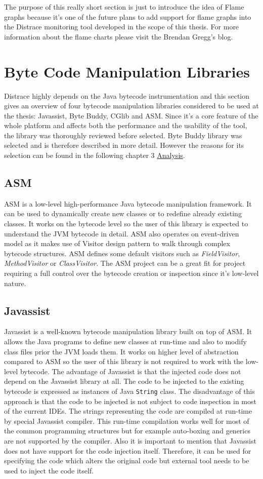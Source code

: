 The purpose of this really short section is just to introduce the idea of Flame graphs because it's one of the future plans to add support for flame graphs into the Distrace monitoring tool developed in the scope of this thesis. For more information about the flame charts please visit the Brendan Gregg's blog.
\section{Byte Code Manipulation Libraries}
Distrace highly depends on the Java bytecode instrumentation and this section gives an overview of four bytecode manipulation libraries considered to be used at the thesis: Javassist, Byte Buddy, CGlib and ASM. Since it's a core feature of the whole platform and affects both the performance and the usability of the tool, the library was thoroughly reviewed before selected. Byte Buddy library was selected and is therefore described in more detail. However the reasons for its selection can be found in the following chapter 3 \hyperref[analysis]{Analysis}.

\subsection{ASM}
\label{asm}
ASM is a low-level high-performance Java bytecode manipulation framework. It can be used to dynamically create new classes or to redefine already existing classes. It works on the bytecode level so the user of this library is expected to understand the JVM bytecode in detail. ASM also operates on event-driven model as it makes use of Visitor design pattern to walk through complex bytecode structures. ASM defines some default visitors such as \textit{FieldVisitor}, \textit{MethodVisitor} or \textit{ClassVisitor}. The ASM project can be a great fit for project requiring a full control over the bytecode creation or inspection since it's low-level nature.
\subsection{Javassist}
\label{javassist}
Javassist is a well-known bytecode manipulation library built on top of ASM. It allows the Java programs to define new classes at run-time and also to modify class files prior the JVM loads them. It works on higher level of abstraction compared to ASM so the user of this library is not required to work with the low-level bytecode. The advantage of Javassist is that the injected code does not depend on the Javassist library at all. The code to be injected to the existing bytecode is expressed as instances of Java \texttt{String} class. The disadvantage of this approach is that the code to be injected is not subject to code inspection in most of the current IDEs. The strings representing the code are compiled at run-time by special Javassist compiler. This run-time compilation works well for most of the common programming structures but for example auto-boxing and generics are not supported by the compiler. Also it is important to mention that Javassist does not have support for the code injection itself. Therefore, it can be used for specifying the code which alters the original code but external tool needs to be used to inject the code itself.
